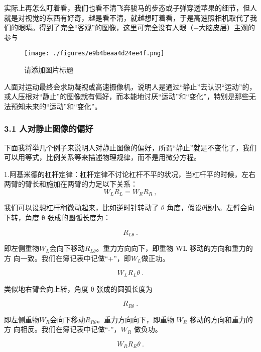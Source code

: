 实际上再怎么盯着看，我们也看不清飞奔骏马的步态或⼦弹穿透苹果的细节，但⼈就是对视觉的东西有好奇，越是看不清，就越想盯着看，于是⾼速照相机取代了我们的眼睛。得到了完全“客观”的图像，这里可完全没有⼈眼（+⼤脑皮层）主观的参与
\begin{figure}[ht]
\centering
\texttt{[image: ./figures/e9b4beaa4d24ee4f.png]}
\caption{请添加图片标题} \label{fig_AtomId_10}
\end{figure}

⼈面对运动最终会求助凝视或⾼速摄像机，说明⼈是通过“静⽌”去认识“运动”的，或⼈压根对“静⽌”的图像就有偏好，⽽本能地讨厌“运动”和“变化”，特别是那些⽆法预知未来的“运动”和“变化”。

\subsubsection{3.1 人对静止图像的偏好}
下面我将举⼏个例⼦来说明⼈对静⽌图像的偏好，所谓“静⽌”就是不变化了，我们可以用等式，比例关系等来描述物理规律，⽽不是用微分⽅程。

1.阿基米德的杠杆定律：杠杆定律不讨论杠杆不平的状况，当杠杆平的时候，左右两臂的臂长和施加在两臂的力足以下关系：
\begin{equation}
W_L R_L = W_R R_R~,
\end{equation}

我们可以设想杠杆稍微动起来，比如逆时针转动了 $\theta$ 角度，假设$\theta$很小。左臂会向下转，角度 θ 张成的圆弧长度为：

\begin{equation}
R_{L\theta}~.
\end{equation}

即左侧重物$W_L$会向下移动$R_{L\theta}$。重⼒⽅向向下，即重物 WL 移动的⽅向和重⼒的⽅
向⼀致。我们在簿记表中记做“+”，即$W_L$做正功。

\begin{equation}
W_L R_L \theta~.
\end{equation}

类似地右臂会向上转，角度 θ 张成的圆弧长度为

\begin{equation}
R_{R\theta}~.
\end{equation}

即左侧重物$W_R$会向下移动$R_{R\theta}$。重⼒⽅向向下，即重物 $W_R$ 移动的⽅向和重⼒的⽅
向相反。我们在簿记表中记做“-”，$W_R$ 做负功。

\begin{equation}
W_R R_R \theta~.
\end{equation}

